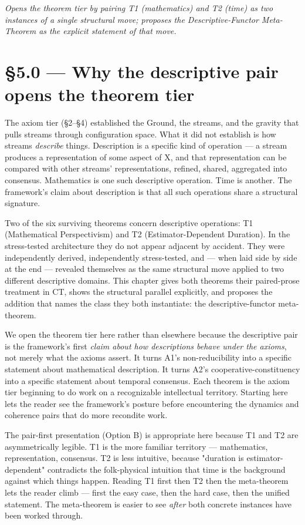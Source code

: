 \documentclass[11pt, openany]{book}
\newcommand{\sectionbreak}{\clearpage}
\begin{document}
\textit{Opens the theorem tier by pairing T1 (mathematics) and T2 (time) as two instances of a single structural move; proposes the Descriptive-Functor Meta-Theorem as the explicit statement of that move.}

\sectionbreak

\section{§5.0 --- Why the descriptive pair opens the theorem tier}

The axiom tier (§2–§4) established the Ground, the streams, and the gravity that pulls streams through configuration space. What it did not establish is how streams \textit{describe} things. Description is a specific kind of operation --- a stream produces a representation of some aspect of X, and that representation can be compared with other streams' representations, refined, shared, aggregated into consensus. Mathematics is one such descriptive operation. Time is another. The framework's claim about description is that all such operations share a structural signature.

Two of the six surviving theorems concern descriptive operations: T1 (Mathematical Perspectivism) and T2 (Estimator-Dependent Duration). In the stress-tested architecture they do not appear adjacent by accident. They were independently derived, independently stress-tested, and --- when laid side by side at the end --- revealed themselves as the same structural move applied to two different descriptive domains. This chapter gives both theorems their paired-prose treatment in CT, shows the structural parallel explicitly, and proposes the addition that names the class they both instantiate: the descriptive-functor meta-theorem.

We open the theorem tier here rather than elsewhere because the descriptive pair is the framework's first \textit{claim about how descriptions behave under the axioms}, not merely what the axioms assert. It turns A1's non-reducibility into a specific statement about mathematical description. It turns A2's cooperative-constituency into a specific statement about temporal consensus. Each theorem is the axiom tier beginning to do work on a recognizable intellectual territory. Starting here lets the reader see the framework's posture before encountering the dynamics and coherence pairs that do more recondite work.

The pair-first presentation (Option B) is appropriate here because T1 and T2 are asymmetrically legible. T1 is the more familiar territory --- mathematics, representation, consensus. T2 is less intuitive, because "duration is estimator-dependent" contradicts the folk-physical intuition that time is the background against which things happen. Reading T1 first then T2 then the meta-theorem lets the reader climb --- first the easy case, then the hard case, then the unified statement. The meta-theorem is easier to see \textit{after} both concrete instances have been worked through.
\end{document}
